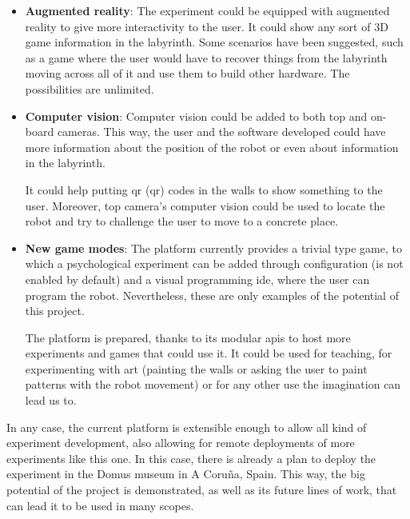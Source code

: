 \begin{itemize}

	\item \textbf{Augmented reality}: The experiment could be equipped with augmented reality to
	give more interactivity to the user. It could show any sort of 3D game information in the
	labyrinth. Some scenarios have been suggested, such as a game where the user would have to
	recover things from the labyrinth moving across all of it and use them to build other hardware.
	The possibilities are unlimited.

	\item \textbf{Computer vision}: Computer vision could be added to both top and on-board cameras.
	This way, the user and the software developed could have more information about the position of
	the robot or even about information in the labyrinth.

	It could help putting \acrshort{qr}  (\acrlong{qr}) codes in the walls to show something to the
	user. Moreover, top camera's computer vision could be used to locate the robot and try to
	challenge the user to move to a concrete place.

	\item \textbf{New game modes}: The platform currently provides a trivial type game, to which a
	psychological experiment can be added through configuration (is not enabled by default) and a
	visual programming \acrshort{ide}, where the user can program the robot. Nevertheless, these are
	only examples of the potential of this project.

	The platform is prepared, thanks to its modular \acrshort{api}s to host more experiments and
	games that could use it. It could be used for teaching, for experimenting with art (painting the
	walls or asking the user to paint patterns with the robot movement) or for any other use the
	imagination can lead us to.

\end{itemize}

In any case, the current platform is extensible enough to allow all kind of experiment development,
also allowing for remote deployments of more experiments like this one. In this case, there is
already a plan to deploy the experiment in the Domus museum in A Coruña, Spain. This way, the big
potential of the project is demonstrated, as well as its future lines of work, that can lead it to
be used in many scopes.
